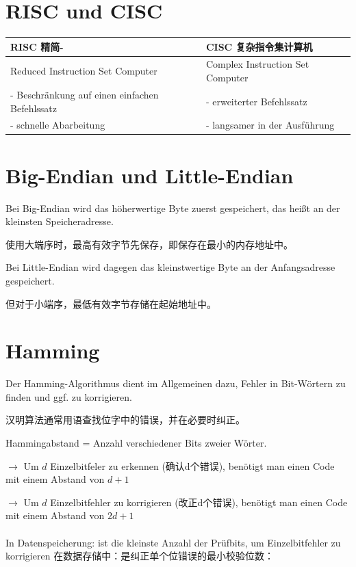\documentclass[fleqn]{article}
\begin{document}
\section{RISC und CISC}

\begin{center}
    \begin{tabular}{|l|l|}
        \hline
        RISC 精简- & CISC 复杂指令集计算机\\
        \hline
        Reduced Instruction Set Computer & Complex Instruction Set Computer\\
        - Beschränkung auf einen einfachen Befehlssatz & - erweiterter Befehlssatz\\
        - schnelle Abarbeitung & - langsamer in der Ausführung\\
        \hline
    \end{tabular}
\end{center}

\section{Big-Endian und Little-Endian}

Bei Big-Endian wird das höherwertige Byte zuerst gespeichert, das heißt an der kleinsten Speicheradresse.

使用大端序时，最高有效字节先保存，即保存在最小的内存地址中。

Bei Little-Endian wird dagegen das kleinstwertige Byte an der Anfangsadresse gespeichert.

但对于小端序，最低有效字节存储在起始地址中。

\section{Hamming}

Der Hamming-Algorithmus dient im Allgemeinen dazu, Fehler in Bit-Wörtern zu finden und ggf. zu korrigieren.

汉明算法通常用语查找位字中的错误，并在必要时纠正。

\noindent Hammingabstand = Anzahl verschiedener Bits zweier Wörter.

$\rightarrow$ Um $d$ Einzelbitfeler zu erkennen (确认d个错误), benötigt man einen Code mit einem Abstand von $d+1$

$\rightarrow$ Um $d$ Einzelbitfehler zu korrigieren (改正d个错误), benötigt man einen Code mit einem Abstand von $2d+1$
\\
\\
In Datenspeicherung: ist die kleinste Anzahl der Prüfbits, um Einzelbitfehler zu korrigieren
在数据存储中：是纠正单个位错误的最小校验位数：
\end{document}
